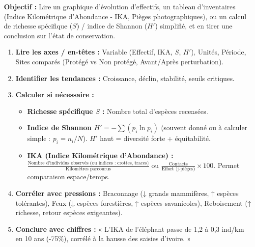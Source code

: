 \documentclass[11pt]{article}
\begin{document}
\begin{methode}
    \textbf{Objectif :} Lire un graphique d'évolution d'effectifs, un tableau d'inventaires (Indice Kilométrique d'Abondance - IKA, Pièges photographiques), ou un calcul de richesse spécifique ($S$) / indice de Shannon ($H'$) simplifié, et en tirer une conclusion sur l'état de conservation.
    \begin{enumerate}
        \item \textbf{Lire les axes / en-têtes :} Variable (Effectif, IKA, $S$, $H'$), Unités, Période, Sites comparés (Protégé vs Non protégé, Avant/Après perturbation).
        \item \textbf{Identifier les tendances :} Croissance, déclin, stabilité, seuils critiques.
        \item \textbf{Calculer si nécessaire :}
              \begin{itemize}
                  \item \textbf{Richesse spécifique $S$ :} Nombre total d'espèces recensées.
                  \item \textbf{Indice de Shannon $H' = -\sum (p_i \ln p_i)$} (souvent donné ou à calculer simple : $p_i = n_i / N$). $H'$ haut = diversité forte + équitabilité.
                  \item \textbf{IKA (Indice Kilométrique d'Abondance) :} $\frac{\text{Nombre d'individus observés (ou indices : crottes, traces)}}{\text{Kilomètres parcourus}}$ ou $\frac{\text{Contacts}}{\text{Effort (j-pièges)}} \times 100$. Permet comparaison espace/temps.
              \end{itemize}
        \item \textbf{Corréler avec pressions :} Braconnage (↓ grands mammifères, ↑ espèces tolérantes), Feux (↓ espèces forestières, ↑ espèces savanicoles), Reboisement (↑ richesse, retour espèces exigeantes).
        \item \textbf{Conclure avec chiffres :} « L'IKA de l'éléphant passe de 1,2 à 0,3 ind/km en 10 ans (-75\%), corrélé à la hausse des saisies d'ivoire. »
    \end{enumerate}
\end{methode}
\end{document}
